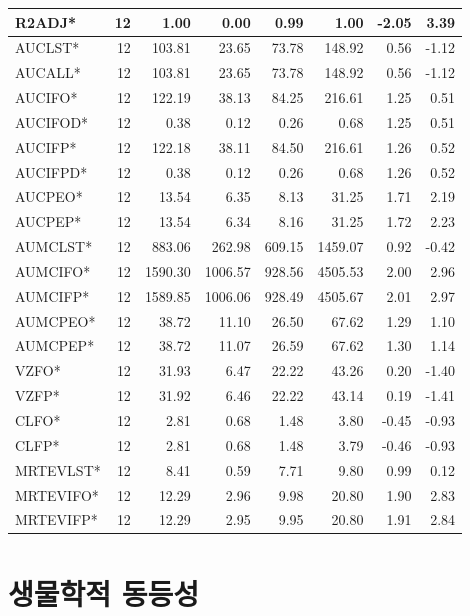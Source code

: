 \documentclass[12pt,]{krantz}
\theoremstyle{definition}
\theoremstyle{definition}
\theoremstyle{definition}
\theoremstyle{remark}
\begin{document}
\begin{tabular}{l|r|r|r|r|r|r|r}
R2ADJ* & 12 & 1.00 & 0.00 & 0.99 & 1.00 & -2.05 & 3.39\\
\hline
AUCLST* & 12 & 103.81 & 23.65 & 73.78 & 148.92 & 0.56 & -1.12\\
\hline
AUCALL* & 12 & 103.81 & 23.65 & 73.78 & 148.92 & 0.56 & -1.12\\
\hline
AUCIFO* & 12 & 122.19 & 38.13 & 84.25 & 216.61 & 1.25 & 0.51\\
\hline
AUCIFOD* & 12 & 0.38 & 0.12 & 0.26 & 0.68 & 1.25 & 0.51\\
\hline
AUCIFP* & 12 & 122.18 & 38.11 & 84.50 & 216.61 & 1.26 & 0.52\\
\hline
AUCIFPD* & 12 & 0.38 & 0.12 & 0.26 & 0.68 & 1.26 & 0.52\\
\hline
AUCPEO* & 12 & 13.54 & 6.35 & 8.13 & 31.25 & 1.71 & 2.19\\
\hline
AUCPEP* & 12 & 13.54 & 6.34 & 8.16 & 31.25 & 1.72 & 2.23\\
\hline
AUMCLST* & 12 & 883.06 & 262.98 & 609.15 & 1459.07 & 0.92 & -0.42\\
\hline
AUMCIFO* & 12 & 1590.30 & 1006.57 & 928.56 & 4505.53 & 2.00 & 2.96\\
\hline
AUMCIFP* & 12 & 1589.85 & 1006.06 & 928.49 & 4505.67 & 2.01 & 2.97\\
\hline
AUMCPEO* & 12 & 38.72 & 11.10 & 26.50 & 67.62 & 1.29 & 1.10\\
\hline
AUMCPEP* & 12 & 38.72 & 11.07 & 26.59 & 67.62 & 1.30 & 1.14\\
\hline
VZFO* & 12 & 31.93 & 6.47 & 22.22 & 43.26 & 0.20 & -1.40\\
\hline
VZFP* & 12 & 31.92 & 6.46 & 22.22 & 43.14 & 0.19 & -1.41\\
\hline
CLFO* & 12 & 2.81 & 0.68 & 1.48 & 3.80 & -0.45 & -0.93\\
\hline
CLFP* & 12 & 2.81 & 0.68 & 1.48 & 3.79 & -0.46 & -0.93\\
\hline
MRTEVLST* & 12 & 8.41 & 0.59 & 7.71 & 9.80 & 0.99 & 0.12\\
\hline
MRTEVIFO* & 12 & 12.29 & 2.96 & 9.98 & 20.80 & 1.90 & 2.83\\
\hline
MRTEVIFP* & 12 & 12.29 & 2.95 & 9.95 & 20.80 & 1.91 & 2.84\\
\hline
\end{tabular}

\section{생물학적 동등성}\label{bioequivalence}
\end{document}
